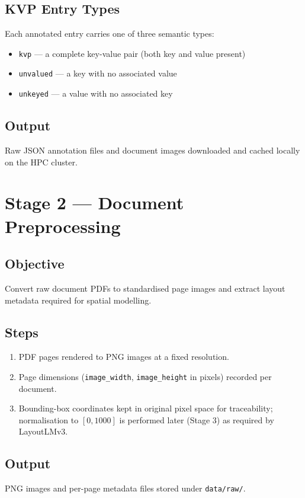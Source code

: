 \documentclass[11pt,a4paper]{article}
\begin{document}
\subsection*{KVP Entry Types}
Each annotated entry carries one of three semantic types:
\begin{itemize}[noitemsep]
  \item \texttt{kvp} --- a complete key-value pair (both key and value present)
  \item \texttt{unvalued} --- a key with no associated value
  \item \texttt{unkeyed} --- a value with no associated key
\end{itemize}

\subsection*{Output}
Raw JSON annotation files and document images downloaded and cached locally
on the HPC cluster.

\section{Stage 2 --- Document Preprocessing}

\subsection*{Objective}
Convert raw document PDFs to standardised page images and extract layout
metadata required for spatial modelling.

\subsection*{Steps}
\begin{enumerate}[noitemsep]
  \item PDF pages rendered to PNG images at a fixed resolution.
  \item Page dimensions (\texttt{image\_width}, \texttt{image\_height} in
        pixels) recorded per document.
  \item Bounding-box coordinates kept in original pixel space for
        traceability; normalisation to $[0, 1000]$ is performed later
        (Stage 3) as required by LayoutLMv3.
\end{enumerate}

\subsection*{Output}
PNG images and per-page metadata files stored under \texttt{data/raw/}.
\end{document}
